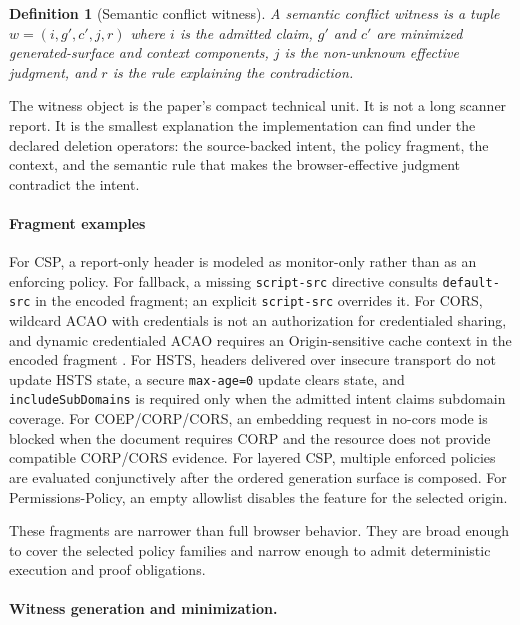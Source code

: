 \documentclass[10pt,conference]{IEEEtran}
\newtheorem{definition}{Definition}
\begin{document}
\begin{definition}[Semantic conflict witness]
A semantic conflict witness is a tuple $w=(i,g',c',j,r)$ where $i$ is the admitted claim, $g'$ and $c'$ are minimized generated-surface and context components, $j$ is the non-unknown effective judgment, and $r$ is the rule explaining the contradiction.
\end{definition}

The witness object is the paper's compact technical unit. It is not a long scanner report. It is the smallest explanation the implementation can find under the declared deletion operators: the source-backed intent, the policy fragment, the context, and the semantic rule that makes the browser-effective judgment contradict the intent.

\paragraph{Fragment examples}

For CSP, a report-only header is modeled as monitor-only rather than as an enforcing policy. For fallback, a missing \texttt{script-src} directive consults \texttt{default-src} in the encoded fragment; an explicit \texttt{script-src} overrides it. For CORS, wildcard ACAO with credentials is not an authorization for credentialed sharing, and dynamic credentialed ACAO requires an Origin-sensitive cache context in the encoded fragment \cite{whatwg_fetch_2026}. For HSTS, headers delivered over insecure transport do not update HSTS state, a secure \texttt{max-age=0} update clears state, and \texttt{includeSubDomains} is required only when the admitted intent claims subdomain coverage. For COEP/CORP/CORS, an embedding request in no-cors mode is blocked when the document requires CORP and the resource does not provide compatible CORP/CORS evidence. For layered CSP, multiple enforced policies are evaluated conjunctively after the ordered generation surface is composed. For Permissions-Policy, an empty allowlist disables the feature for the selected origin.

These fragments are narrower than full browser behavior. They are broad enough to cover the selected policy families and narrow enough to admit deterministic execution and proof obligations.

\paragraph{Witness generation and minimization.}
\end{document}
